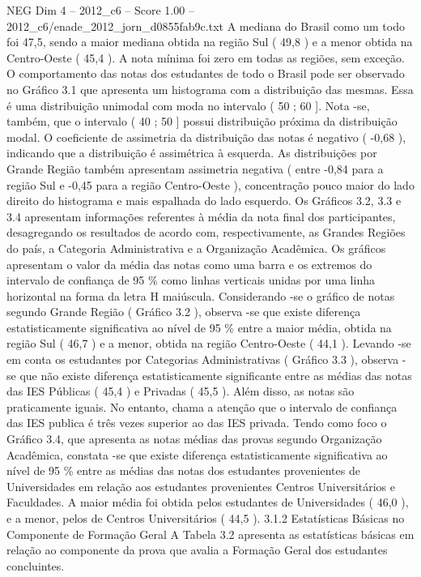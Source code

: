 \begin{textsample}{NEG Dim 4 – 2012\_c6 – Score 1.00 – 2012\_c6/enade\_2012\_jorn\_d0855fab9c.txt}
A mediana do Brasil como um todo foi 47,5, sendo a maior mediana obtida na região Sul ( 49,8 ) e a menor obtida na Centro-Oeste ( 45,4 ).
A nota mínima foi zero em todas as regiões, sem exceção.
O comportamento das notas dos estudantes de todo o Brasil pode ser observado no Gráfico 3.1 que apresenta um histograma com a distribuição das mesmas.
Essa é uma distribuição unimodal com moda no intervalo ( 50 ; 60 ].
Nota -se, também, que o intervalo ( 40 ; 50 ] possui distribuição próxima da distribuição modal.
O coeficiente de assimetria da distribuição das notas é negativo ( -0,68 ), indicando que a distribuição é assimétrica à esquerda.
As distribuições por Grande Região também apresentam assimetria negativa ( entre -0,84 para a região Sul e -0,45 para a região Centro-Oeste ), concentração pouco maior do lado direito do histograma e mais espalhada do lado esquerdo.
Os Gráficos 3.2, 3.3 e 3.4 apresentam informações referentes à média da nota final dos participantes, desagregando os resultados de acordo com, respectivamente, as Grandes Regiões do país, a Categoria Administrativa e a Organização Acadêmica.
Os gráficos apresentam o valor da média das notas como uma barra e os extremos do intervalo de confiança de 95 \% como linhas verticais unidas por uma linha horizontal na forma da letra H maiúscula.
Considerando -se o gráfico de notas segundo Grande Região ( Gráfico 3.2 ), observa -se que existe diferença estatisticamente significativa ao nível de 95 \% entre a maior média, obtida na região Sul ( 46,7 ) e a menor, obtida na região Centro-Oeste ( 44,1 ).
Levando -se em conta os estudantes por Categorias Administrativas ( Gráfico 3.3 ), observa -se que não existe diferença estatisticamente significante entre as médias das notas das IES Públicas ( 45,4 ) e Privadas ( 45,5 ).
Além disso, as notas são praticamente iguais.
No entanto, chama a atenção que o intervalo de confiança das IES publica é três vezes superior ao das IES privada.
Tendo como foco o Gráfico 3.4, que apresenta as notas médias das provas segundo Organização Acadêmica, constata -se que existe diferença estatisticamente significativa ao nível de 95 \% entre as médias das notas dos estudantes provenientes de Universidades em relação aos estudantes provenientes Centros Universitários e Faculdades.
A maior média foi obtida pelos estudantes de Universidades ( 46,0 ), e a menor, pelos de Centros Universitários ( 44,5 ). 3.1.2 Estatísticas Básicas no Componente de Formação Geral A Tabela 3.2 apresenta as estatísticas básicas em relação ao componente da prova que avalia a Formação Geral dos estudantes concluintes.

\end{textsample}
